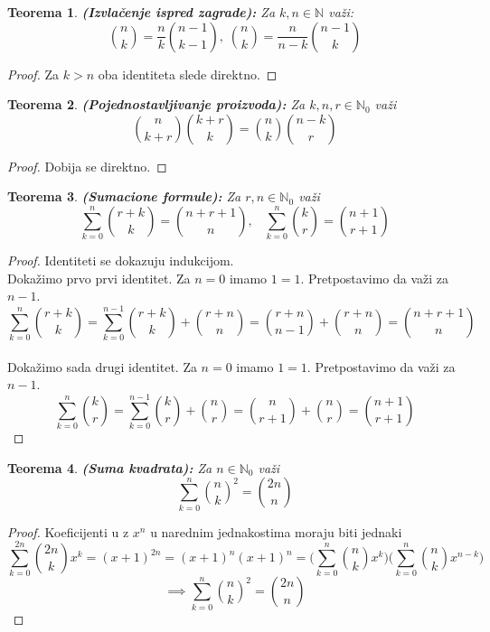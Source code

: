 \documentclass[a4paper,12pt]{article}
\numberwithin{algorithm}{section}
\theoremstyle{plain}
\newtheorem{theorem}{Teorema}[section]
\theoremstyle{definition}
\theoremstyle{remark}
\begin{document}
\begin{theorem}
    \textbf{(Izvlačenje ispred zagrade):} Za $k, n \in \mathbb{N}$ važi:
    \[ {{n} \choose k} = \frac{n}{k} {{n - 1} \choose {k - 1}}, \; {{n} \choose {k}} = \frac{n}{n-k} {{n - 1} \choose k} \]
\end{theorem}
\begin{proof}
    Za $k > n$ oba identiteta slede direktno.
\end{proof}

\begin{theorem}
    \textbf{(Pojednostavljivanje proizvoda):} Za $k, n, r \in \mathbb{N}_0$ važi
    \[ {{n} \choose k + r}{{k + r} \choose k} = {{n} \choose k}{{n - k} \choose r} \]
\end{theorem}
\begin{proof}
    Dobija se direktno.
\end{proof}

\begin{theorem}
    \textbf{(Sumacione formule):} Za $r, n \in \mathbb{N}_0$ važi
    \[ \sum_{k= 0}^{n}{{r + k} \choose k} = {{n + r + 1}\choose n}, \;\;\;   \sum_{k= 0}^{n}{{k} \choose r} = {{n + 1}\choose r + 1}\]
\end{theorem}
\begin{proof}
    Identiteti se dokazuju indukcijom.\\
    Dokažimo prvo prvi identitet. Za $n = 0$ imamo $1 = 1$. Pretpostavimo da važi za $n - 1$.
    \[ \sum_{k = 0}^{n} {{r + k} \choose k} = \sum_{k = 0}^{n - 1}{{r + k} \choose k} + {{r + n} \choose n} = {{r + n} \choose {n - 1}} + {{r + n} \choose n} = {{n + r + 1} \choose n} \] \\

    \noindent Dokažimo sada drugi identitet. Za $n = 0$ imamo $1 = 1$. Pretpostavimo da važi za $n - 1$.
    \[ \sum_{k = 0}^{n} {{k} \choose r} = \sum_{k = 0}^{n-1} {{k} \choose r} + {{n} \choose r} = {{n} \choose {r + 1}} + {{n} \choose r} = {{n + 1} \choose {r + 1}} \]
\end{proof}

\begin{theorem}
    \textbf{(Suma kvadrata):} Za $n \in \mathbb{N}_0$ važi
    \[ \sum_{k = 0}^{n} {{n} \choose k}^2 = {{2n} \choose n} \]
\end{theorem}
\begin{proof} Koeficijenti u z $x^n$ u narednim jednakostima moraju biti jednaki
    \[  \sum_{k = 0}^{2n}{{2n} \choose k} x^k = (x + 1)^{2n} = (x+1)^n (x+1)^n = \bigg(\sum_{k = 0}^{n}{{n} \choose k}x^k\bigg)\bigg(\sum_{k = 0}^{n}{{n} \choose k}x^{n-k}\bigg)  \]
    \[ \implies \sum_{k = 0}^{n} {{n} \choose k}^2 = {{2n} \choose n} \]
\end{proof}
\newpage
\end{document}
